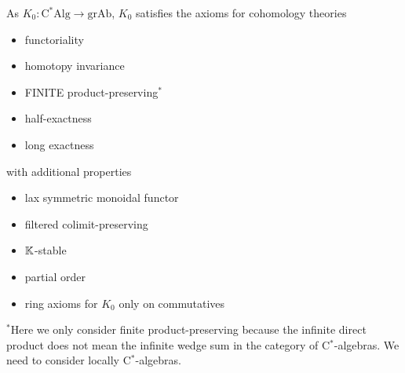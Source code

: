 \documentclass{../../large}
\begin{document}
As $K_0:\mathrm{C^*Alg}\to\mathrm{grAb}$, $K_0$ satisfies the axioms for cohomology theories
\begin{itemize}
\item functoriality
\item homotopy invariance
\item FINITE product-preserving$^*$
\item half-exactness
\item long exactness
\end{itemize}
with additional properties
\begin{itemize}
\item lax symmetric monoidal functor
\item filtered colimit-preserving
\item $\mathbb{K}$-stable
\item partial order
\item ring axioms for $K_0$ only on commutatives
\end{itemize}

$^*$Here we only consider finite product-preserving because the infinite direct product does not mean the infinite wedge sum in the category of C$^*$-algebras.
We need to consider locally C$^*$-algebras.
\end{document}
